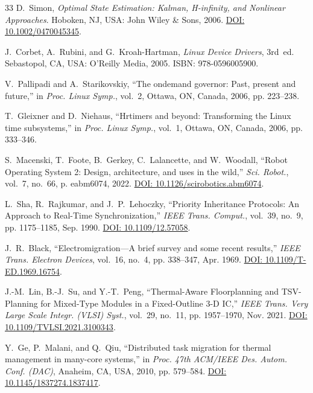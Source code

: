 \documentclass[journal]{IEEEtran}
\begin{document}
\begin{thebibliography}{33}
D.~Simon, \emph{Optimal State Estimation: Kalman, H-infinity, and Nonlinear Approaches}. Hoboken, NJ, USA: John Wiley \& Sons, 2006. \href{https://doi.org/10.1002/0470045345}{DOI: 10.1002/0470045345}.

J.~Corbet, A.~Rubini, and G.~Kroah-Hartman, \emph{Linux Device Drivers}, 3rd~ed. Sebastopol, CA, USA: O'Reilly Media, 2005. ISBN: 978-0596005900.

V.~Pallipadi and A.~Starikovskiy, ``The ondemand governor: Past, present and future,'' in \emph{Proc. Linux Symp.}, vol.~2, Ottawa, ON, Canada, 2006, pp. 223--238.

T.~Gleixner and D.~Niehaus, ``Hrtimers and beyond: Transforming the Linux time subsystems,'' in \emph{Proc. Linux Symp.}, vol.~1, Ottawa, ON, Canada, 2006, pp. 333--346.

S.~Macenski, T.~Foote, B.~Gerkey, C.~Lalancette, and W.~Woodall, ``Robot Operating System 2: Design, architecture, and uses in the wild,'' \emph{Sci. Robot.}, vol.~7, no.~66, p. eabm6074, 2022. \href{https://doi.org/10.1126/scirobotics.abm6074}{DOI: 10.1126/scirobotics.abm6074}.

L.~Sha, R.~Rajkumar, and J.~P.~Lehoczky, ``Priority Inheritance Protocols: An Approach to Real-Time Synchronization,'' \emph{IEEE Trans. Comput.}, vol.~39, no.~9, pp. 1175--1185, Sep. 1990. \href{https://doi.org/10.1109/12.57058}{DOI: 10.1109/12.57058}.

J.~R.~Black, ``Electromigration---A brief survey and some recent results,'' \emph{IEEE Trans. Electron Devices}, vol.~16, no.~4, pp. 338--347, Apr. 1969. \href{https://doi.org/10.1109/T-ED.1969.16754}{DOI: 10.1109/T-ED.1969.16754}.

J.-M.~Lin, B.-J.~Su, and Y.-T.~Peng, ``Thermal-Aware Floorplanning and TSV-Planning for Mixed-Type Modules in a Fixed-Outline 3-D IC,'' \emph{IEEE Trans. Very Large Scale Integr. (VLSI) Syst.}, vol.~29, no.~11, pp. 1957--1970, Nov. 2021. \href{https://doi.org/10.1109/TVLSI.2021.3100343}{DOI: 10.1109/TVLSI.2021.3100343}.

Y.~Ge, P.~Malani, and Q.~Qiu, ``Distributed task migration for thermal management in many-core systems,'' in \emph{Proc. 47th ACM/IEEE Des. Autom. Conf. (DAC)}, Anaheim, CA, USA, 2010, pp. 579--584. \href{https://doi.org/10.1145/1837274.1837417}{DOI: 10.1145/1837274.1837417}.
\end{thebibliography}
\end{document}
